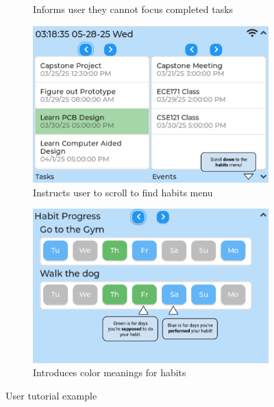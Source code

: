 \documentclass{article}
\begin{document}
\begin{figure}
\begin{subfigure}{0.5\textwidth}
        \caption{Informs user they cannot focus completed tasks}
    \end{subfigure}
    \begin{subfigure}{0.5\textwidth}
        \includegraphics[width = \textwidth]{scroll_habits.png}
        \caption{Instructs user to scroll to find habits menu}
    \end{subfigure}
    \begin{subfigure}{0.5\textwidth}
        \includegraphics[width = \textwidth]{habit_tutorial.png}
        \caption{Introduces color meanings for habits}
    \end{subfigure}
\caption{User tutorial example}
\label{fig:user_tutorial}
\end{figure}
\end{document}
